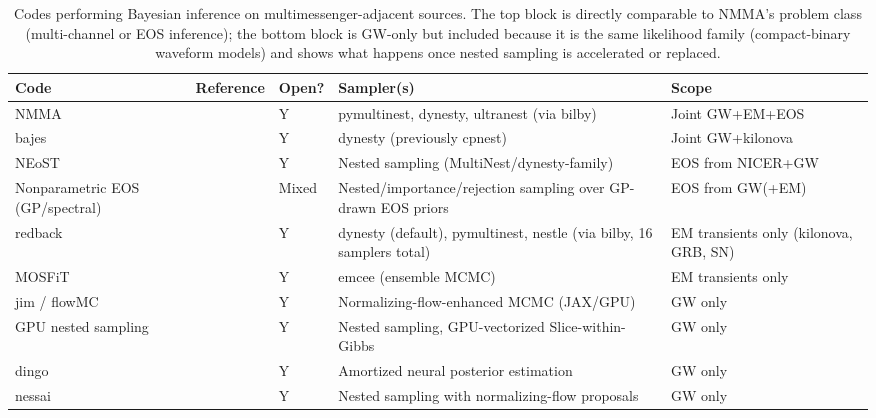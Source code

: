 \documentclass[11pt]{article}
\begin{document}
\begin{table}[htbp]
\centering
\small
\begin{tabular}{@{}p{2.3cm}p{2.0cm}p{1.1cm}p{3.9cm}p{3.9cm}@{}}
\toprule
\textbf{Code} & \textbf{Reference} & \textbf{Open?} & \textbf{Sampler(s)} & \textbf{Scope} \\
\midrule
NMMA & \cite{Coughlin:2018fis,Pang:2022rzc,Rose:2026cnm} & Y & pymultinest, dynesty, ultranest (via bilby) & Joint GW+EM+EOS \\
bajes & \cite{Breschi:2021wzr,Breschi:2024qlc} & Y & dynesty (previously cpnest) & Joint GW+kilonova \\
NEoST & \cite{Raaijmakers:2025hbz} & Y & Nested sampling (MultiNest/dynesty-family) & EOS from NICER+GW \\
Nonparametric EOS (GP/spectral) & \cite{Landry:2020vaw,Legred:2021hdx,Finch:2025bao,Ng:2025wdj} & Mixed & Nested/importance/rejection sampling over GP-drawn EOS priors & EOS from GW(+EM) \\
redback & \cite{Sarin:2023khf} & Y & dynesty (default), pymultinest, nestle (via bilby, 16 samplers total) & EM transients only (kilonova, GRB, SN) \\
MOSFiT & \cite{Guillochon:2017bmg} & Y & emcee (ensemble MCMC) & EM transients only \\
\midrule
jim / flowMC & \cite{Wong:2023lgb,Wong:2022xvh} & Y & Normalizing-flow-enhanced MCMC (JAX/GPU) & GW only \\
GPU nested sampling & \cite{Yallup:2026nqc} & Y & Nested sampling, GPU-vectorized Slice-within-Gibbs & GW only \\
dingo & \cite{Dax:2021tsq,Dax:2022pxd} & Y & Amortized neural posterior estimation & GW only \\
nessai & \cite{Williams:2021qyt,Williams:2023ppp} & Y & Nested sampling with normalizing-flow proposals & GW only \\
\bottomrule
\end{tabular}
\caption{Codes performing Bayesian inference on multimessenger-adjacent sources. The top
block is directly comparable to NMMA's problem class (multi-channel or EOS inference); the
bottom block is GW-only but included because it is the same likelihood family (compact-binary
waveform models) and shows what happens once nested sampling is accelerated or replaced.}
\label{tab:codes}
\end{table}
\end{document}
